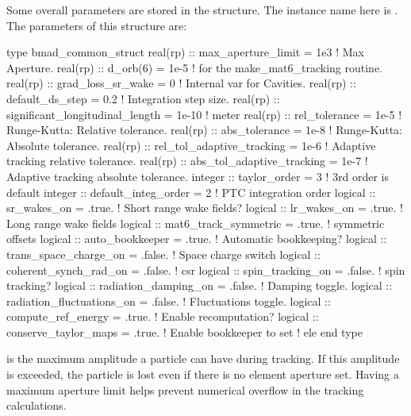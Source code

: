 Some overall parameters are stored in the 
structure. The instance name here is . The parameters of
this structure are:
\begin{example}
  type bmad_common_struct
    real(rp) :: max_aperture_limit = 1e3       ! Max Aperture.
    real(rp) :: d_orb(6)           = 1e-5      ! for the make_mat6_tracking routine.
    real(rp) :: grad_loss_sr_wake  = 0         ! Internal var for Cavities.
    real(rp) :: default_ds_step    = 0.2       ! Integration step size.  
    real(rp) :: significant_longitudinal_length = 1e-10 ! meter 
    real(rp) :: rel_tolerance = 1e-5           ! Runge-Kutta: Relative tolerance.
    real(rp) :: abs_tolerance = 1e-8           ! Runge-Kutta: Absolute tolerance.
    real(rp) :: rel_tol_adaptive_tracking = 1e-6  ! Adaptive tracking relative tolerance.
    real(rp) :: abs_tol_adaptive_tracking = 1e-7  ! Adaptive tracking absolute tolerance.
    integer :: taylor_order = 3                ! 3rd order is default
    integer :: default_integ_order = 2         ! PTC integration order
    logical :: sr_wakes_on = .true.            ! Short range wake fields?
    logical :: lr_wakes_on = .true.            ! Long range wake fields
    logical :: mat6_track_symmetric = .true.   ! symmetric offsets
    logical :: auto_bookkeeper = .true.        ! Automatic bookkeeping?
    logical :: trans_space_charge_on = .false. ! Space charge switch
    logical :: coherent_synch_rad_on = .false. ! csr 
    logical :: spin_tracking_on = .false.      ! spin tracking?
    logical :: radiation_damping_on = .false.       ! Damping toggle.
    logical :: radiation_fluctuations_on = .false.  ! Fluctuations toggle.
    logical :: compute_ref_energy = .true.          ! Enable recomputation?
    logical :: conserve_taylor_maps = .true.        ! Enable bookkeeper to set
                                                    ! ele%
  end type
\end{example}

 is the maximum amplitude a particle can have
during tracking. If this amplitude is exceeded, the particle is
lost even if there is no element aperture set. Having a maximum
aperture limit helps prevent numerical overflow in the tracking calculations.

